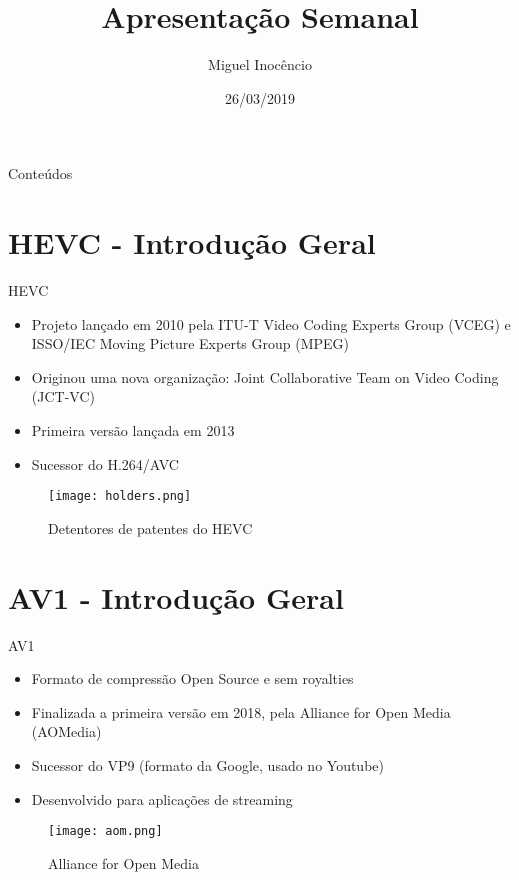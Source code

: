 \documentclass{beamer}
\title[Apresentação Semanal]{Apresentação Semanal}
\author{Miguel Inocêncio}
\institute{Universidade de Aveiro}
\date{26/03/2019}
\begin{document}
\begin{frame}
	\titlepage
\end{frame}

\begin{frame}{Conteúdos}
	\tableofcontents
\end{frame}

\section{HEVC - Introdução Geral}
\begin{frame}{HEVC}
	\begin{itemize}
		\item Projeto lançado em 2010 pela ITU-T Video Coding Experts Group (VCEG) e ISSO/IEC Moving Picture Experts Group (MPEG)
		\item Originou uma nova organização: Joint Collaborative Team on Video Coding (JCT-VC)
		\item Primeira versão lançada em 2013
		\item Sucessor do H.264/AVC
	\end{itemize}

	\begin{figure}
		\texttt{[image: holders.png]}
		\caption{\label{fig:hevc_holders}Detentores de patentes do HEVC}
	\end{figure}
\end{frame}

\section{AV1 - Introdução Geral}
\begin{frame}{AV1}
	\begin{itemize}
		\item Formato de compressão Open Source e sem royalties
		\item Finalizada a primeira versão em 2018, pela Alliance for Open Media (AOMedia)
		\item Sucessor do VP9 (formato da Google, usado no Youtube)
		\item Desenvolvido para aplicações de streaming
	\end{itemize}

	\begin{figure}
		\texttt{[image: aom.png]}
		\caption{\label{fig:AOM}Alliance for Open Media}
	\end{figure}
\end{frame}
\end{document}
